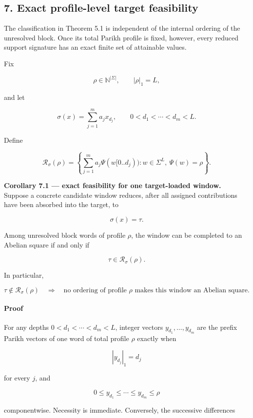 \documentclass[
  british,
  a4paper,
  11pt]{article}
\begin{document}
\subsection{7. Exact profile-level target
feasibility}\label{exact-profile-level-target-feasibility}

The classification in Theorem 5.1 is independent of the internal
ordering of the unresolved block. Once its total Parikh profile is
fixed, however, every reduced support signature has an exact finite set
of attainable values.

Fix

\[
\rho\in\mathbb N^{|\Sigma|},
\qquad
|\rho|_1=L,
\]

and let

\[
\sigma(x)=\sum_{j=1}^m a_jx_{d_j},
\qquad
0<d_1<\cdots<d_m<L.
\tag{7.1}
\]

Define

\[
\mathcal R_\sigma(\rho)
=
\left\{
\sum_{j=1}^m a_j\Psi(w[0..d_j)):
w\in\Sigma^L,\ \Psi(w)=\rho
\right\}.
\tag{7.2}
\]

\textbf{Corollary 7.1 --- exact feasibility for one target-loaded
window.}\\
Suppose a concrete candidate window reduces, after all assigned
contributions have been absorbed into the target, to

\[
\sigma(x)=\tau.
\tag{7.3}
\]

Among unresolved block words of profile \(\rho\), the window can be
completed to an Abelian square if and only if

\[
\tau\in\mathcal R_\sigma(\rho).
\tag{7.4}
\]

In particular,

\[
\tau\notin\mathcal R_\sigma(\rho)
\quad\Longrightarrow\quad
\text{no ordering of profile }\rho\text{ makes this window an Abelian square}.
\tag{7.5}
\]

\paragraph{Proof}\label{proof-5}

For any depths \(0<d_1<\cdots<d_m<L\), integer vectors
\(y_{d_1},\ldots,y_{d_m}\) are the prefix Parikh vectors of one word of
total profile \(\rho\) exactly when

\[
|y_{d_j}|_1=d_j
\]

for every \(j\), and

\[
0\le y_{d_1}\le\cdots\le y_{d_m}\le\rho
\]

componentwise. Necessity is immediate. Conversely, the successive
differences
\end{document}
